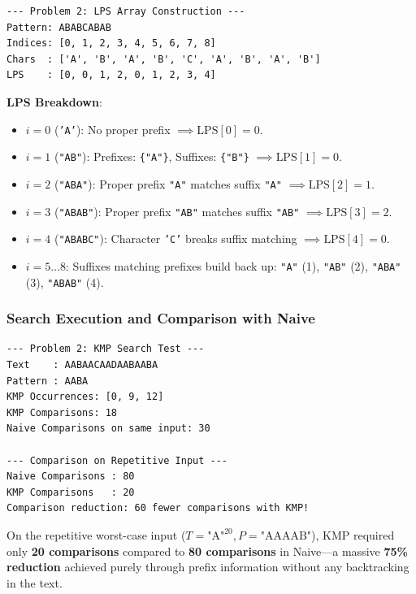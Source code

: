 \documentclass[12pt]{article}
\begin{document}
\begin{lstlisting}[style=output, caption={LPS Array Output}]
--- Problem 2: LPS Array Construction ---
Pattern: ABABCABAB
Indices: [0, 1, 2, 3, 4, 5, 6, 7, 8]
Chars  : ['A', 'B', 'A', 'B', 'C', 'A', 'B', 'A', 'B']
LPS    : [0, 0, 1, 2, 0, 1, 2, 3, 4]
\end{lstlisting}

\textbf{LPS Breakdown}:
\begin{itemize}
    \item $i=0$ (\texttt{'A'}): No proper prefix $\implies \text{LPS}[0] = 0$.
    \item $i=1$ (\texttt{"AB"}): Prefixes: \texttt{\{"A"\}}, Suffixes: \texttt{\{"B"\}} $\implies \text{LPS}[1] = 0$.
    \item $i=2$ (\texttt{"ABA"}): Proper prefix \texttt{"A"} matches suffix \texttt{"A"} $\implies \text{LPS}[2] = 1$.
    \item $i=3$ (\texttt{"ABAB"}): Proper prefix \texttt{"AB"} matches suffix \texttt{"AB"} $\implies \text{LPS}[3] = 2$.
    \item $i=4$ (\texttt{"ABABC"}): Character \texttt{'C'} breaks suffix matching $\implies \text{LPS}[4] = 0$.
    \item $i=5 \dots 8$: Suffixes matching prefixes build back up: \texttt{"A"} (1), \texttt{"AB"} (2), \texttt{"ABA"} (3), \texttt{"ABAB"} (4).
\end{itemize}

\subsubsection{Search Execution and Comparison with Naive}
\begin{lstlisting}[style=output, caption={KMP vs Naive Comparison on Standard and Repetitive Inputs}]
--- Problem 2: KMP Search Test ---
Text    : AABAACAADAABAABA
Pattern : AABA
KMP Occurrences: [0, 9, 12]
KMP Comparisons: 18
Naive Comparisons on same input: 30

--- Comparison on Repetitive Input ---
Naive Comparisons : 80
KMP Comparisons   : 20
Comparison reduction: 60 fewer comparisons with KMP!
\end{lstlisting}

On the repetitive worst-case input ($T = \text{"A"}^{20}, P = \text{"AAAAB"}$), KMP required only \textbf{20 comparisons} compared to \textbf{80 comparisons} in Naive—a massive \textbf{75\% reduction} achieved purely through prefix information without any backtracking in the text.
\end{document}
